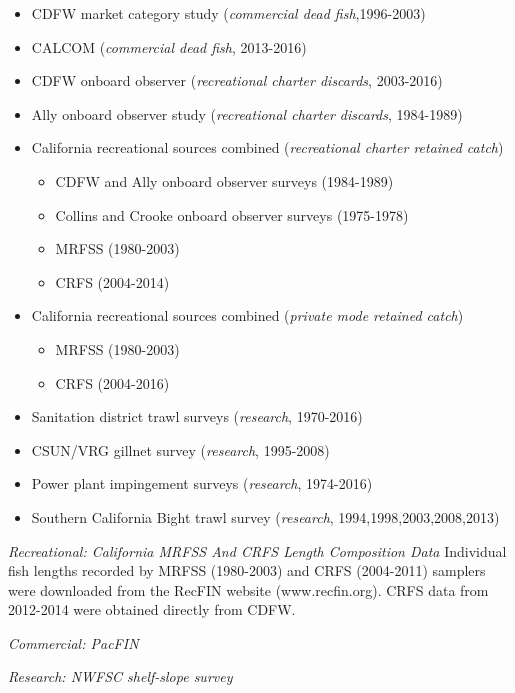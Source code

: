 \documentclass[12pt,]{article}
\begin{document}
\begin{itemize}[noitemsep,nolistsep,topsep=0pt]
  \item CDFW market category study (\emph{commercial dead fish},1996-2003)    
  \item CALCOM (\emph{commercial dead fish}, 2013-2016)    
  \item CDFW onboard observer (\emph{recreational charter discards}, 2003-2016)    
  \item Ally onboard observer study (\emph{recreational charter discards}, 1984-1989)  
  \item California recreational sources combined (\emph{recreational charter retained catch})     
    \begin{itemize}[noitemsep,nolistsep]
      \item CDFW and Ally onboard observer surveys (1984-1989)     
      \item Collins and Crooke onboard observer surveys (1975-1978)     
      \item MRFSS (1980-2003)     
      \item CRFS (2004-2014)
    \end{itemize}
 \item California recreational sources combined (\emph{private mode retained catch})      
    \begin{itemize}[noitemsep,nolistsep]   
      \item MRFSS (1980-2003)      
      \item CRFS (2004-2016)  
    \end{itemize}
 \item Sanitation district trawl surveys (\emph{research}, 1970-2016)      
 \item CSUN/VRG gillnet survey (\emph{research}, 1995-2008)        
 \item Power plant impingement surveys (\emph{research}, 1974-2016) 
 \item Southern California Bight trawl survey (\emph{research}, 1994,1998,2003,2008,2013) 
\end{itemize}

\emph{Recreational: California MRFSS And CRFS Length Composition Data}
Individual fish lengths recorded by MRFSS (1980-2003) and CRFS
(2004-2011) samplers were downloaded from the RecFIN website
(www.recfin.org). CRFS data from 2012-2014 were obtained directly from
CDFW.

\emph{Commercial: PacFIN}

\emph{Research: NWFSC shelf-slope survey}
\end{document}
